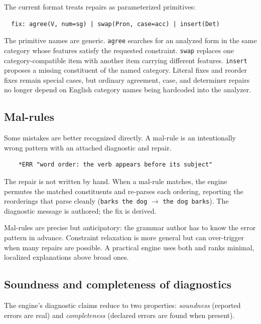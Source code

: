 \documentclass[11pt]{article}
\theoremstyle{definition}
\theoremstyle{plain}
\theoremstyle{remark}
\begin{document}
The current format treats repairs as parameterized primitives:

\begin{verbatim}
  fix: agree(V, num=sg) | swap(Pron, case=acc) | insert(Det)
\end{verbatim}

The primitive names are generic. \texttt{agree} searches for an analyzed form in
the same category whose features satisfy the requested constraint.
\texttt{swap} replaces one category-compatible item with another item carrying
different features. \texttt{insert} proposes a missing constituent of the named
category. Literal fixes and reorder fixes remain special cases, but ordinary
agreement, case, and determiner repairs no longer depend on English category
names being hardcoded into the analyzer.

\subsection{Mal-rules}

Some mistakes are better recognized directly. A mal-rule is an intentionally wrong pattern with
an attached diagnostic and repair.

\begin{lstlisting}[language=gram]
%mal S -> V NP
    *ERR "word order: the verb appears before its subject"
\end{lstlisting}

The repair is not written by hand. When a mal-rule matches, the engine permutes the
matched constituents and re-parses each ordering, reporting the reorderings that parse
cleanly (\texttt{barks the dog} $\to$ \texttt{the dog barks}). The diagnostic message is
authored; the fix is derived.

Mal-rules are precise but anticipatory: the grammar author has to know the error pattern in
advance. Constraint relaxation is more general but can over-trigger when many repairs are
possible. A practical engine uses both and ranks minimal, localized explanations above broad
ones.

\subsection{Soundness and completeness of diagnostics}
\label{sec:soundness}

The engine's diagnostic claims reduce to two properties: \emph{soundness} (reported errors
are real) and \emph{completeness} (declared errors are found when present).
\end{document}
